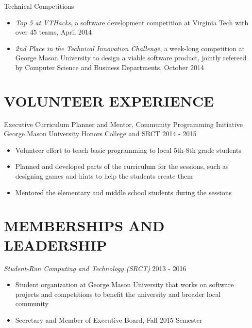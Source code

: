 \documentclass[margin, 10pt]{res} %
\begin{document}
\begin{resume}
Technical Competitions
\begin{itemize} \itemsep -2pt %
\item {\sl Top 5 at VTHacks}, a software development competition at Virginia Tech with over 45 teams, April 2014
\item {\sl 2nd Place in the Technical Innovation Challenge}, a week-long competition at George Mason University to design a viable software product, jointly refereed by Computer Science and Business Departments, October 2014
\end{itemize}


\section{VOLUNTEER EXPERIENCE}

Executive Curriculum Planner and Mentor, Community Programming Initiative \\ George Mason University Honors College and SRCT
 \hfill 2014 - 2015
\begin{itemize} \itemsep -2pt %
\item Volunteer effort to teach basic programming to local 5th-8th grade students
\item Planned and developed parts of the curriculum for the sessions, such as designing games and hints to help the students create them
\item Mentored the elementary and middle school students during the sessions
\end{itemize} 


\section{MEMBERSHIPS AND LEADERSHIP}
{\sl Student-Run Computing and Technology (SRCT)} \hfill 2013 - 2016 \begin{itemize} \itemsep -2pt %
\item Student organization at George Mason University that works on software projects and competitions to benefit the university and broader local community
\item Secretary and Member of Executive Board, Fall 2015 Semester
\end{itemize}


\end{resume}
\end{document}
